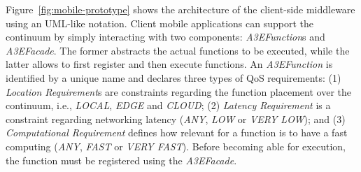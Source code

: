 Figure~\ref{fig:mobile-prototype} shows the architecture of the client-side middleware using an UML-like notation. Client mobile applications can support the continuum by simply interacting with two components:  \textit{A3EFunction}s and \textit{A3EFacade}. The former abstracts the actual functions to be executed, while the latter allows to first register and then execute functions. An \textit{A3EFunction} is identified by a unique name and declares three types of QoS requirements: 
(1) \textit{Location Requirement}s are constraints regarding the function placement over the continuum, i.e., \textit{LOCAL}, \textit{EDGE} and \textit{CLOUD}; 
(2) \textit{Latency Requirement} is a constraint regarding networking latency (\textit{ANY}, \textit{LOW} or \textit{VERY LOW}); and 
(3) \textit{Computational Requirement} defines how relevant for a function is to have a fast computing (\textit{ANY}, \textit{FAST} or \textit{VERY FAST}). Before becoming able for execution, the function must be registered using the \textit{A3EFacade}. 


